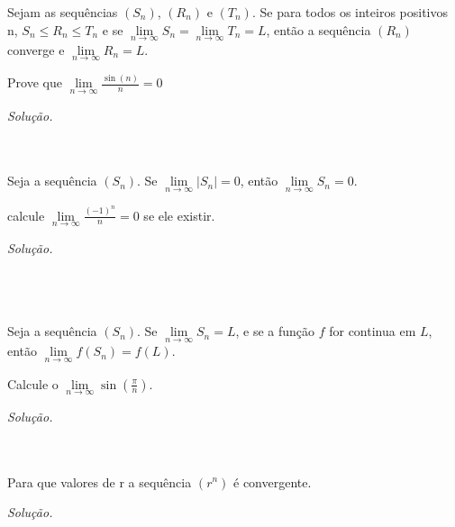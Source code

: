 \begin{teo} 
Sejam as sequências $\left( S_{n}\right) $, $\left( R_{n}\right) $ e $\left( T_{n}\right) $. Se para todos os inteiros positivos n, $S_{n}\leq R_{n} \leq T_{n}$ e se $\lim\limits_{n\longrightarrow \infty} S_{n} =\lim\limits_{n\longrightarrow \infty} T_{n}=L$, então a sequência $\left( R_{n}\right) $ converge e $\lim\limits_{n\longrightarrow \infty} R_{n}=L$.
\end{teo}
\begin{ex} 
	Prove que $\lim\limits_{n\longrightarrow \infty} \frac{\sin (n)}{n}=0$
\end{ex}
\textit{Solução.}
\vspace*{3cm}
\\
\\
\\

\begin{teo} 
	Seja a sequência $\left( S_{n}\right) $. Se $\lim\limits_{n\longrightarrow \infty} \left| S_{n} \right| =0$, então  $\lim\limits_{n\longrightarrow \infty} S_{n}=0$.
\end{teo}
\begin{ex} 
	calcule $\lim\limits_{n\longrightarrow \infty} \frac{(-1)^{n}}{n}=0$ se ele existir.
\end{ex}
\textit{Solução.}
\vspace*{5cm}
\\
\\
\\
\\

\begin{teo} 
	Seja a sequência $\left( S_{n}\right) $. Se $\lim\limits_{n\longrightarrow \infty} S_{n}  =L$, e se a função $f$ for continua em $L$, então  $\lim\limits_{n\longrightarrow \infty} f(S_{n})=f(L)$.
\end{teo}
\begin{ex} 
	Calcule o $\lim\limits_{n\longrightarrow \infty} \sin(\frac{\pi}{n})$.
\end{ex}
\textit{Solução.}
\vspace*{5cm}
\\
\\
\\

\begin{ex}
	Para que valores de r a sequência $\left( r^{n}\right) $ é convergente.
\end{ex}
\textit{Solução.}
\vspace*{15cm}

